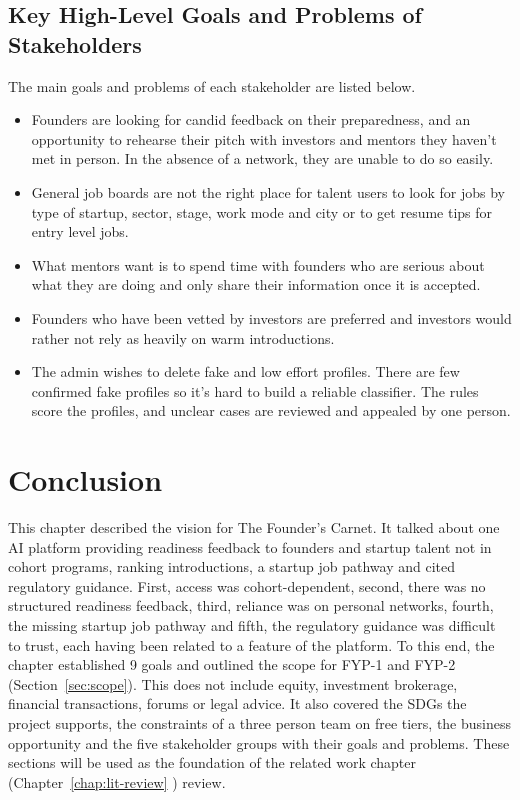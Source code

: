 \documentclass{FastFyp}
\begin{document}
\subsection{Key High-Level Goals and Problems of Stakeholders}
The main goals and problems of each stakeholder are listed below.
\begin{itemize}
\item Founders are looking for candid feedback on their preparedness, and an opportunity to rehearse their pitch with investors and mentors they haven't met in person. In the absence of a network, they are unable to do so easily.
\item General job boards are not the right place for talent users to look for jobs by type of startup, sector, stage, work mode and city or to get resume tips for entry level jobs.
\item What mentors want is to spend time with founders who are serious about what they are doing and only share their information once it is accepted.
\item Founders who have been vetted by investors are preferred and investors would rather not rely as heavily on warm introductions.
\item The admin wishes to delete fake and low effort profiles. There are few confirmed fake profiles so it's hard to build a reliable classifier. The rules score the profiles, and unclear cases are reviewed and appealed by one person.
\end{itemize}


\section{Conclusion}
This chapter described the vision for The Founder's Carnet. It talked about one AI platform providing readiness feedback to founders and startup talent not in cohort programs, ranking introductions, a startup job pathway and cited regulatory guidance. First, access was cohort-dependent, second, there was no structured readiness feedback, third, reliance was on personal networks, fourth, the missing startup job pathway and fifth, the regulatory guidance was difficult to trust, each having been related to a feature of the platform. To this end, the chapter established 9 goals and outlined the scope for FYP-1 and FYP-2 (Section~\ref{sec:scope}). This does not include equity, investment brokerage, financial transactions, forums or legal advice. It also covered the SDGs the project supports, the constraints of a three person team on free tiers, the business opportunity and the five stakeholder groups with their goals and problems. These sections will be used as the foundation of the related work chapter (Chapter~\ref{chap:lit-review} ) review.
\pagebreak
\end{document}
